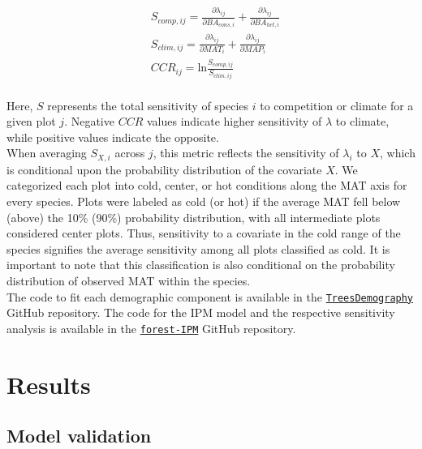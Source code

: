 \begin{equation}
\begin{split}
&S_{comp, ij} = \frac{\partial \lambda_{ij}}{\partial BA_{cons, i}} + \frac{\partial \lambda_{ij}}{\partial BA_{het, i}} \\[2pt]
&S_{clim, ij} = \frac{\partial \lambda_{ij}}{\partial MAT_{i}} + \frac{\partial \lambda_{ij}}{\partial MAP_{i}} \\[2pt]
&CCR_{ij} = \text{ln} \frac{S_{comp, ij}}{S_{clim, ij}}
\end{split}
\label{eq:CCR}\end{equation}\\

Here, \(S\) represents the total sensitivity of species \(i\) to
competition or climate for a given plot \(j\). Negative \(CCR\) values
indicate higher sensitivity of \(\lambda\) to climate, while positive
values indicate the opposite.\\

When averaging \(S_{X,i}\) across \(j\), this metric reflects the
sensitivity of \(\lambda_i\) to \(X\), which is conditional upon the
probability distribution of the covariate \(X\). We categorized each
plot into cold, center, or hot conditions along the MAT axis for every
species. Plots were labeled as cold (or hot) if the average MAT fell
below (above) the 10\% (90\%) probability distribution, with all
intermediate plots considered center plots. Thus, sensitivity to a
covariate in the cold range of the species signifies the average
sensitivity among all plots classified as cold. It is important to note
that this classification is also conditional on the probability
distribution of observed MAT within the species.\\

The code to fit each demographic component is available in the
\href{https://github.com/willvieira/TreesDemography}{\texttt{TreesDemography}}
GitHub repository. The code for the IPM model and the respective
sensitivity analysis is available in the
\href{https://github.com/willvieira/forest-IPM/tree/master/simulations/covariates_perturbation}{\texttt{forest-IPM}}
GitHub repository.\\

\hypertarget{results}{%
\section{Results}\label{results}}

\hypertarget{model-validation}{%
\subsection{Model validation}\label{model-validation}}

